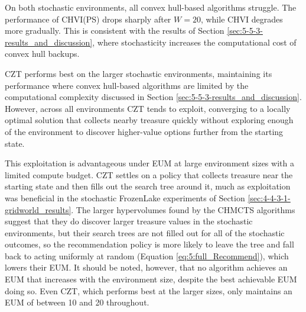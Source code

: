     On both stochastic environments, all convex hull-based algorithms struggle. The performance of CHVI(PS) drops sharply after $W=20$, while CHVI degrades more gradually. This is consistent with the results of Section \ref{sec:5-5-3-results_and_discussion}, where stochasticity increases  the computational cost of convex hull backups.

    CZT performs best on the larger stochastic environments, maintaining its performance where convex hull-based algorithms are limited by the computational complexity discussed in Section \ref{sec:5-5-3-results_and_discussion}. However, across all environments CZT tends to exploit, converging to a locally optimal solution that collects nearby treasure quickly without exploring enough of the environment to discover higher-value options further from the starting state.

    This exploitation is advantageous under EUM at large environment sizes with a limited compute budget. CZT settles on a policy that collects treasure near the starting state and then fills out the search tree around it, much as exploitation was beneficial in the stochastic FrozenLake experiments of Section \mbox{\ref{sec:4-4-3-1-gridworld_results}}. The larger hypervolumes found by the CHMCTS algorithms suggest that they do discover larger treasure values in the stochastic environments, but their search trees are not filled out for all of the stochastic outcomes, so the recommendation policy is more likely to leave the tree and fall back to acting uniformly at random (Equation \mbox{\eqref{eq:5:full_Recommend}}), which lowers their EUM. It should be noted, however, that no algorithm achieves an EUM that increases with the environment size, despite the best achievable EUM doing so. Even CZT, which performs best at the larger sizes, only maintains an EUM of between 10 and 20 throughout.














